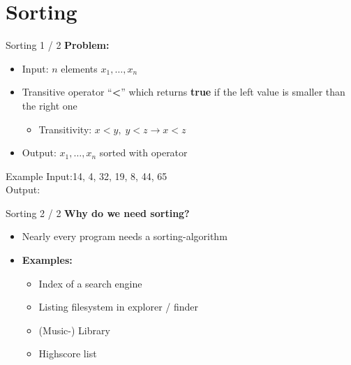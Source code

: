 \section{Sorting}

\begin{frame}{Sorting 1 / 2}
  \textbf{Problem:}
  \begin{itemize}
    \item
      Input: $n$ elements $x_1, \ldots, x_n$
    \item
      Transitive operator \enquote{\textbf{\color{Mittel-Blau}<}} which returns
      \textbf{\color{Mittel-Blau}true} if the left value is smaller than the 
      right one
      \begin{itemize}
        \item
          Transitivity: $x < y, \; y < z \rightarrow x < z$
      \end{itemize}
    \item
      Output: $x_1, \ldots, x_n$ sorted with operator
  \end{itemize}
  \begin{exampleblock}{Example}
    Input:\hspace*{1.5em}14, 4, 32, 19, 8, 44, 65\\
    Output:
  \end{exampleblock}
\end{frame}


\begin{frame}{Sorting 2 / 2}
  \textbf{Why do we need sorting?}
  \begin{itemize}
    \item
      Nearly {\color{Mittel-Blau}every} program needs a sorting-algorithm
    \item
      \textbf{Examples:}
      \begin{itemize}
        \item
          Index of a search engine
        \item
          Listing filesystem in explorer / finder
        \item
          (Music-) Library
        \item
          Highscore list
      \end{itemize}
  \end{itemize}
\end{frame}
